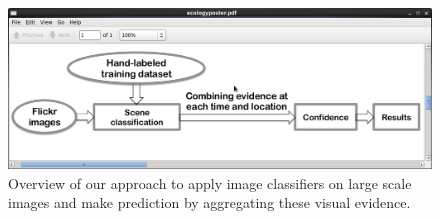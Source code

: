\documentclass[10pt]{article}
\begin{document}
\begin{figure}[h]
\includegraphics[scale=.3]{figure/overview.png}
\caption{Overview of our approach to apply image classifiers on large scale images and make prediction by aggregating these visual evidence.}
\label{fig:overview}
\end{figure}
\end{document}
